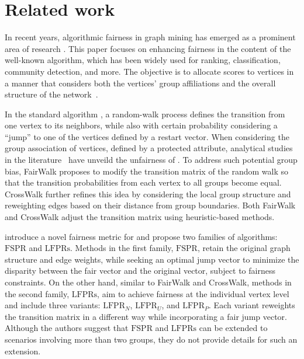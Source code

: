 \documentclass[sigconf, anonymous, review]{acmart}
\begin{document}

\section{Related work}

In recent years, algorithmic fairness in graph mining has emerged as a prominent area of research
\citep{saxena2024fairsna}. This paper focuses on enhancing fairness in the content of the well-known \pagerank algorithm, which has been widely used for ranking, classification, community detection, and more. The objective %
is to allocate \pagerank scores to vertices in a manner that considers both the vertices' group affiliations and the overall structure of the network~\citep{tsioutsiouliklis_fairness-aware_2021,saxena2024fairsna}.

In the standard \pagerank algorithm \citep{gleich_pagerank_2015,brin_anatomy_1998,tabrizi2013personalized}, 
a random-walk process defines the transition from one vertex to its neighbors,
while also with certain probability considering a ``jump'' to one of the vertices defined by a restart vector.
When considering the group association of vertices, defined by a protected attribute, 
analytical studies in the literature~\citep{espin2022inequality,ghoshal2011ranking} 
have unveild the unfairness of \pagerank.
To address such potential group bias, 
FairWalk \citep{rahman_fairwalk_2019} proposes to modify the transition matrix of the random walk
so that the transition probabilities from each vertex to all groups become equal. 
CrossWalk \citep{khajehnejad_crosswalk_2022} further refines this idea by considering 
the local group structure and reweighting edges based on their distance from group boundaries. 
Both FairWalk and CrossWalk adjust the transition matrix using heuristic-based methods.

\citet{tsioutsiouliklis_fairness-aware_2021} introduce a novel fairness metric for \pagerank 
and propose two families of algorithms: $\mathrm{FSPR}$ and $\mathrm{LFPRs}$. 
Methods in the first family, $\mathrm{FSPR}$, retain the original graph structure and edge weights, 
while seeking an optimal jump vector to minimize the disparity between the fair \pagerank vector and 
the original \pagerank vector, subject to fairness constraints. 
On the other hand, similar to FairWalk and CrossWalk, methods in the second family, $\mathrm{LFPRs}$, 
aim to achieve fairness at the individual vertex level and include three variants: 
$\mathrm{LFPR}_N$, $\mathrm{LFPR}_U$, and $\mathrm{LFPR}_P$. 
Each variant reweights the transition matrix in a different way while incorporating a fair jump vector. 
Although the authors suggest that $\mathrm{FSPR}$ and $\mathrm{LFPRs}$ 
can be extended to scenarios involving more than two groups, 
they do not provide details 
for such an extension. 
\end{document}
